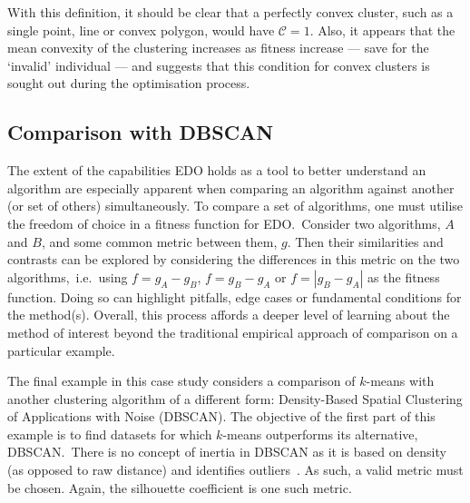 With this definition, it should be clear that a perfectly convex cluster, such
as a single point, line or convex polygon, would have \(\mathcal{C} = 1\). Also,
it appears that the mean convexity of the clustering increases as fitness
increase --- save for the `invalid' individual --- and suggests that this
condition for convex clusters is sought out during the optimisation process.


\subsection{Comparison with DBSCAN}\label{subsec:dbscan}

The extent of the capabilities EDO holds as a tool to better understand an
algorithm are especially apparent when comparing an algorithm against another
(or set of others) simultaneously. To compare a set of algorithms, one must
utilise the freedom of choice in a fitness function for EDO.\ Consider two
algorithms, \(A\) and \(B\), and some common metric between them, \(g\). Then
their similarities and contrasts can be explored by considering the differences
in this metric on the two algorithms,~i.e.\ using \(f=g_A-g_B\), \(f=g_B-g_A\)
or \(f=\left|g_B-g_A\right|\) as the fitness function. Doing so can highlight
pitfalls, edge cases or fundamental conditions for the method(s). Overall, this
process affords a deeper level of learning about the method of interest beyond
the traditional empirical approach of comparison on a particular example.

The final example in this case study considers a comparison of \(k\)-means with
another clustering algorithm of a different form: Density-Based Spatial
Clustering of Applications with Noise (DBSCAN). The objective of the first part
of this example is to find datasets for which \(k\)-means outperforms its
alternative, DBSCAN.\ There is no concept of inertia in DBSCAN as it is based on
density (as opposed to raw distance) and identifies outliers~\cite{Ester1996}.
As such, a valid metric must be chosen. Again, the silhouette coefficient is one
such metric.

